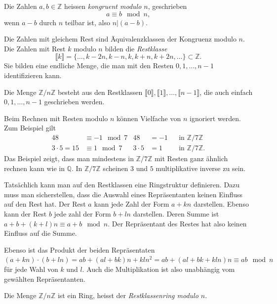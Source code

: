 \begin{definition}
Die Zahlen $a,b\in\mathbb{Z}$ heissen {\em kongruent modulo $n$},
geschrieben
\[
a\equiv b\mod n,
\]
wenn $a-b$ durch $n$ teilbar ist, also $n|(a-b)$.
\end{definition}

Die Zahlen mit gleichem Rest sind Äquivalenzklassen der Kongruenz modulo $n$.
Die Zahlen mit Rest $k$ modulo $n$ bilden die {\em Restklasse}
\[
\llbracket k\rrbracket=\{\dots,k-2n,k-n,k,k+n,k+2n,\dots\} \subset\mathbb{Z}.
\]
Sie bilden eine endliche Menge, die man mit den Resten $0,1,\dots,n-1$
identifizieren kann.

\begin{definition}
Die Menge $\mathbb{Z}/n\mathbb{Z}$ besteht aus den Restklassen
$\llbracket 0\rrbracket,\llbracket 1\rrbracket,\dots,\llbracket n-1\rrbracket$,
die auch einfach $0,1,\dots,n-1$ geschrieben werden.
\end{definition}

Beim Rechnen mit Resten modulo $n$ können Vielfache von $n$ ignoriert werden.
Zum Beispiel gilt 
\[
\begin{aligned}
48&\equiv -1\mod 7& 48&=-1&&\text{in $\mathbb{Z}/7\mathbb{Z}$}
\\
3\cdot 5=15&\equiv 1\mod 7 & 3\cdot 5&=1&&\text{in $\mathbb{Z}/7\mathbb{Z}$.}
\end{aligned}
\]
Das Beispiel zeigt, dass man mindestens in $\mathbb{Z}/7\mathbb{Z}$ mit
Resten ganz ähnlich rechnen kann wie in $\mathbb{Q}$.
In $\mathbb{Z}/7\mathbb{Z}$ scheinen $3$ und $5$ multiplikative inverse
zu sein.

Tatsächlich kann man auf den Restklassen eine Ringstruktur definieren.
Dazu muss man sicherstellen, dass die Auswahl eines Repräsentanten keinen
Einfluss auf den Rest hat.
Der Rest $a$ kann jede Zahl der Form $a+kn$ darstellen.
Ebenso kann der Rest $b$ jede zahl der Form $b+ln$ darstellen.
Deren Summe ist $a+b+(k+l)n\equiv a+b\mod n$.
Der Repräsentant des Restes hat also keinen Einfluss auf die Summe.

Ebenso ist das Produkt der beiden Repräsentaten 
$(a+kn)\cdot(b+ln) = ab + (al+bk)n + kln^2=ab + (al+bk+kln)n\equiv ab\mod n$
für jede Wahl von $k$ und $l$.
Auch die Multiplikation ist also unabhängig vom gewählten Repräsentanten.

\begin{definition}
Die Menge $\mathbb{Z}/n\mathbb{Z}$ ist ein Ring,
heisst der {\em Restklassenring modulo $n$}.
\end{definition}

